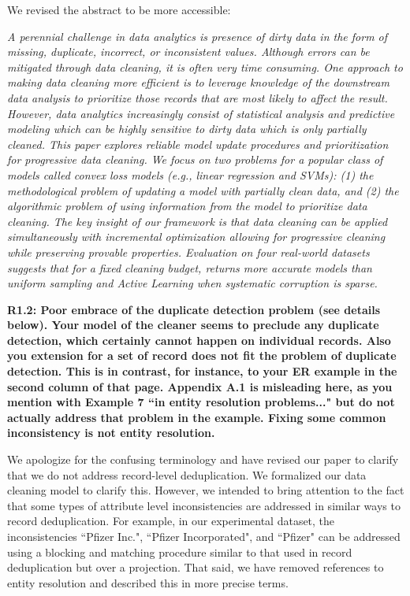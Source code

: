 We revised the abstract to be more accessible:

\emph{A perennial challenge in data analytics is presence of dirty data in the form of missing, duplicate, incorrect, or inconsistent values.
Although errors can be mitigated through data cleaning, it is often very time consuming.
One approach to making data cleaning more efficient is to leverage knowledge of the downstream data analysis to prioritize those records that are most likely to affect the result.
However, data analytics increasingly consist of statistical analysis and predictive modeling which can be highly sensitive to dirty data which is only partially cleaned.
This paper explores reliable model update procedures and prioritization for progressive data cleaning.
We focus on two problems for a popular class of models called convex loss models (e.g., linear regression and SVMs): (1) the methodological problem of updating a model with partially clean data, and (2) the algorithmic problem of using information from the model to prioritize data cleaning.
The key insight of our framework is that data cleaning can be applied simultaneously with incremental optimization allowing for progressive cleaning while preserving provable properties.
Evaluation on four real-world datasets suggests that for a fixed cleaning budget, \sys returns more accurate models than uniform sampling and Active Learning when systematic corruption is sparse. }

\vspace{0.5em}

\noindent\textbf{R1.2: Poor embrace of the duplicate detection problem (see details below). Your model of the cleaner seems to preclude any duplicate detection, which certainly cannot happen on individual records. Also you extension for a set of record does not fit the problem of duplicate detection. This is in contrast, for instance, to your ER example in the second column of that page. Appendix A.1 is misleading here, as you mention with Example 7 ``in entity resolution problems..." but do not actually address that problem in the example. Fixing some common inconsistency is not entity resolution.}

We apologize for the confusing terminology and have revised our paper to clarify that we do not address record-level deduplication.
We formalized our data cleaning model to clarify this.
However, we intended to bring attention to the fact that some types of attribute level inconsistencies are addressed in similar ways to record deduplication.
For example, in our experimental dataset, the inconsistencies ``Pfizer Inc.", ``Pfizer Incorporated", and ``Pfizer" can be addressed using a blocking and matching procedure similar to that used in record deduplication but over a projection.
That said, we have removed references to entity resolution and described this in more precise terms.

